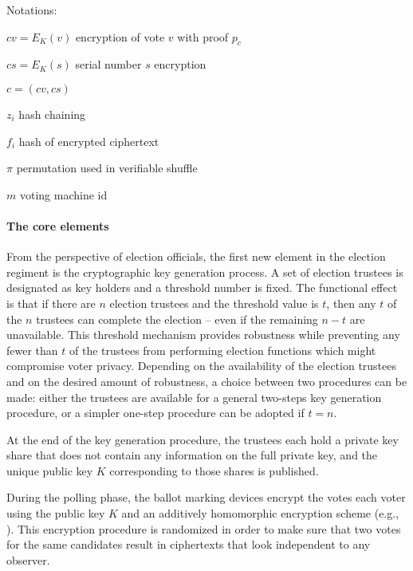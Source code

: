 \label{sec:crypto}


Notations: 
\begin{compactitem}
\item $cv = E_K(v)$ encryption of vote $v$ with proof $p_c$ 
\item $cs = E_K(s)$ serial number $s$ encryption
\item $c = (cv, cs)$
\item $z_i$ hash chaining
\item $f_i$ hash of encrypted ciphertext
\item $\pi$ permutation used in verifiable shuffle
\item $m$ voting machine id
\end{compactitem}

\paragraph{The core elements}
\label{sec:crypto-core}

From the perspective of election officials, the first new element in
the election regiment is the cryptographic key generation process. A
set of election trustees is designated as key holders and a threshold
number is fixed. The functional effect is that if there are $n$
election trustees and the threshold value is $t$, then any $t$ of the
$n$ trustees can complete the election – even if the remaining $n-t$
are unavailable. This threshold mechanism provides robustness while
preventing any fewer than $t$ of the trustees from performing election
functions which might compromise voter privacy. Depending on the
availability of the election trustees and on the desired amount of
robustness, a choice between two procedures can be made: either the
trustees are available for a general two-steps key generation
procedure, or a simpler one-step procedure can be adopted if $t=n$.

At the end of the key generation procedure, the trustees each hold a
private key share that does not contain any information on the full
private key, and the unique public key $K$ corresponding to those
shares is published.

During the polling phase, the ballot marking devices encrypt the votes
each voter using the public key $K$ and an additively homomorphic
encryption scheme (e.g., \elgamal). This encryption procedure is
randomized in order to make sure that two votes for the same
candidates result in ciphertexts that look independent to any
observer. 

